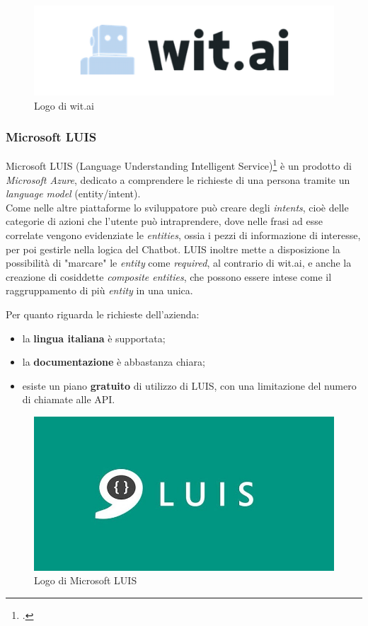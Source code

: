 \begin{figure}[h]
	\centering
	\includegraphics[scale=0.5]{../Immagini/witai.png}
	\caption{Logo di wit.ai}
\end{figure}

\subsubsection{Microsoft LUIS}
Microsoft LUIS (Language Understanding Intelligent Service)\footcite{luis} è un prodotto di \emph{Microsoft Azure}, dedicato a comprendere le richieste di una persona tramite un \emph{language model} (entity/intent). \\
Come nelle altre piattaforme lo sviluppatore può creare degli \emph{intents}, cioè delle categorie di azioni che l'utente può intraprendere, dove nelle frasi ad esse correlate vengono evidenziate le \emph{entities}, ossia i pezzi di informazione di interesse, per poi gestirle nella logica del \gls{Chatbot}. LUIS inoltre mette a disposizione la possibilità di "marcare" le \emph{entity} come \emph{required}, al contrario di wit.ai, e anche la creazione di cosiddette \emph{composite entities}, che possono essere intese come il raggruppamento di più \emph{entity} in una unica.

Per quanto riguarda le richieste dell'azienda:
\begin{itemize}
	\item la \textbf{lingua italiana} è supportata;
	\item la \textbf{documentazione} è abbastanza chiara;
	\item esiste un piano \textbf{gratuito} di utilizzo di LUIS, con una limitazione del numero di chiamate alle API.
\end{itemize}

\begin{figure}[h]
	\centering
	\includegraphics[scale=0.25]{../Immagini/luis.jpg}
	\caption{Logo di Microsoft LUIS}
\end{figure}


